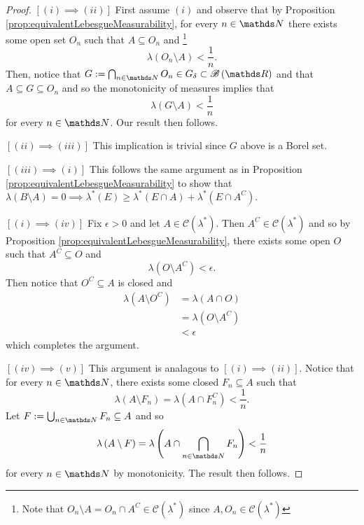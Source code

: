 \begin{proof}
$\left[\left(i\right)\implies\left(ii\right)\right]$ First assume
$\left(i\right)$ and observe that by Proposition \ref{prop:equivalentLebesgueMeasurability},
for every $n\in\N$ there exists some open set $O_{n}$ such that
$A\subseteq O_{n}$ and \footnote{Note that $O_{n}\setminus A=O_{n}\cap A^{C}\in\mathcal{C}\left(\lambda^{*}\right)$
since $A,O_{n}\in\mathcal{C}\left(\lambda^{*}\right)$}
\[
\lambda\left(O_{n}\setminus A\right)<\frac{1}{n}.
\]
Then, notice that $G:=\bigcap_{n\in\N}O_{n}\in G_{\delta}\subset\borel\left(\R\right)$
and that $A\subseteq G\subseteq O_{n}$ and so the monotonicity of
measures implies that 
\[
\lambda\left(G\setminus A\right)<\frac{1}{n}
\]
for every $n\in\N$. Our result then follows.

$\left[\left(ii\right)\implies\left(iii\right)\right]$ This implication
is trivial since $G$ above is a Borel set.

$\left[\left(iii\right)\implies\left(i\right)\right]$ This follows
the same argument as in Proposition \ref{prop:equivalentLebesgueMeasurability}
to show that $\lambda\left(B\setminus A\right)=0\implies\lambda^{*}\left(E\right)\geq\lambda^{*}\left(E\cap A\right)+\lambda^{*}\left(E\cap A^{C}\right).$

$\left[\left(i\right)\implies\left(iv\right)\right]$ Fix $\epsilon>0$
and let $A\in\mathcal{C}\left(\lambda^{*}\right)$. Then $A^{C}\in\mathcal{C}\left(\lambda^{*}\right)$
and so by Proposition \ref{prop:equivalentLebesgueMeasurability},
there exists some open $O$ such that $A^{C}\subseteq O$ and 
\[
\lambda\left(O\setminus A^{C}\right)<\epsilon.
\]
Then notice that $O^{C}\subseteq A$ is closed and 
\begin{align*}
\lambda\left(A\setminus O^{C}\right) & =\lambda\left(A\cap O\right)\\
 & =\lambda\left(O\setminus A^{C}\right)\\
 & <\epsilon
\end{align*}
which completes the argument.

$\left[\left(iv\right)\implies\left(v\right)\right]$ This argument
is analagous to $\left[\left(i\right)\implies\left(ii\right)\right]$.
Notice that for every $n\in\N$, there exists some closed $F_{n}\subseteq A$
such that 
\[
\lambda\left(A\setminus F_{n}\right)=\lambda\left(A\cap F_{n}^{C}\right)<\frac{1}{n}.
\]
Let $F:=\bigcup_{n\in\N}F_{n}\subseteq A$ and so 
\[
\lambda\left(A\setminus F\right)=\lambda\left(A\cap\bigcap_{n\in\N}F_{n}\right)<\frac{1}{n}
\]
for every $n\in\N$ by monotonicity. The result then follows.


\end{proof}
